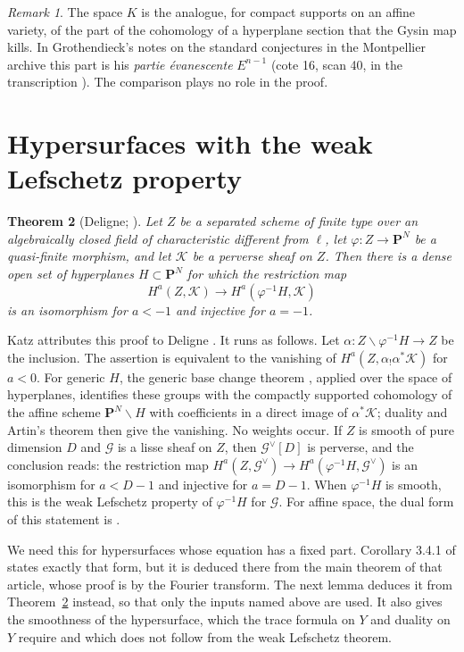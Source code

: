 \documentclass[11pt,a4paper]{article}
\theoremstyle{plain}
\newtheorem{theorem}{Theorem}
\theoremstyle{remark}
\newtheorem{remark}[theorem]{Remark}
\newcommand{\G}{\mathcal G}
\begin{document}
\begin{remark}
The space $K$ is the analogue, for compact supports on an affine variety, of the part of the cohomology of a
hyperplane section that the Gysin map kills. In Grothendieck's notes on the standard conjectures in the Montpellier
archive this part is his \emph{partie \'evanescente} $E^{n-1}$ (cote 16, scan 40, in the transcription
\cite{Archive}). The comparison plays no role in the proof.
\end{remark}

\section{Hypersurfaces with the weak Lefschetz property}\label{sec:lefschetz}

\begin{theorem}[Deligne; {\cite[Appendix, A.5, with A.3 and A.4]{KatzACT}}]\label{thm:deligne}
Let $Z$ be a separated scheme of finite type over an algebraically closed field of characteristic different from
$\ell$, let $\varphi:Z\to\mathbf P^N$ be a quasi-finite morphism, and let $\mathcal K$ be a perverse sheaf on $Z$.
Then there is a dense open set of hyperplanes $H\subset\mathbf P^N$ for which the restriction map
\[
H^a(Z,\mathcal K)\longrightarrow H^a(\varphi^{-1}H,\mathcal K)
\]
is an isomorphism for $a<-1$ and injective for $a=-1$.
\end{theorem}

Katz attributes this proof to Deligne \cite[p.~152]{KatzACT}. It runs as follows. Let
$\alpha:Z\smallsetminus\varphi^{-1}H\to Z$ be the inclusion. The assertion is equivalent to the vanishing of
$H^a(Z,\alpha_!\alpha^*\mathcal K)$ for $a<0$. For generic $H$, the generic base change theorem
\cite[Th\'eor\`emes de finitude, 1.9]{SGA4h}, applied over the space of hyperplanes, identifies these groups with
the compactly supported cohomology of the affine scheme $\mathbf P^N\smallsetminus H$ with coefficients in a direct
image of $\alpha^*\mathcal K$; duality and Artin's theorem then give the vanishing. No weights occur. If $Z$ is
smooth of pure dimension $D$ and $\G$ is a lisse sheaf on $Z$, then $\G^\vee[D]$ is perverse, and the conclusion
reads: the restriction map $H^a(Z,\G^\vee)\to H^a(\varphi^{-1}H,\G^\vee)$ is an isomorphism for $a<D-1$ and
injective for $a=D-1$. When $\varphi^{-1}H$ is smooth, this is the weak Lefschetz property of
$\varphi^{-1}H$ for $\G$. For affine space, the dual form of this statement is \cite[Theorem 2.4]{Zhang}.

We need this for hypersurfaces whose equation has a fixed part. Corollary 3.4.1 of \cite{KatzACT} states exactly that
form, but it is deduced there from the main theorem of that article, whose proof is by the Fourier transform. The
next lemma deduces it from Theorem~\ref{thm:deligne} instead, so that only the inputs named above are used. It also
gives the smoothness of the hypersurface, which the trace formula on $Y$ and duality on $Y$ require and which does
not follow from the weak Lefschetz theorem.
\end{document}
